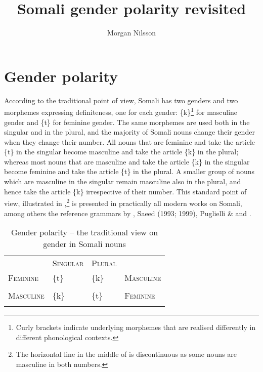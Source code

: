 \documentclass[output=paper]{langsci/langscibook}
\title{Somali gender polarity revisited}
\author{%
 Morgan Nilsson \affiliation{University of Gothenburg }
}
\begin{document}
 

 

\section{Gender polarity}

According to the traditional point of view, Somali has two genders and two morphemes expressing definiteness, one for each gender: \{k\}\footnote{Curly brackets indicate underlying morphemes that are realised differently in different phonological contexts.} for masculine gender and \{t\} for feminine gender. The same morphemes are used both in the singular and in the plural, and the majority of Somali nouns change their gender when they change their number. All nouns that are feminine and take the article \{t\} in the singular become masculine and take the article \{k\} in the plural; whereas most nouns that are masculine and take the article \{k\} in the singular become feminine and take the article \{t\} in the plural. A smaller group of nouns which are masculine in the singular remain masculine also in the plural, and hence take the article \{k\} irrespective of their number. This standard point of view, illustrated in ,\footnote{The horizontal line in the middle of  is discontinuous as some nouns are masculine in both numbers.
} is presented in practically all modern works on Somali, among others the reference grammars by \citet{Moreno1955}, Saeed (1993; 1999), Puglielli \& \citet{Mansuur1999} and \citet{Berchem2012}.
 
\begin{table}
\caption{Gender polarity – the traditional view on gender in Somali nouns}
\label{tab:1}

\begin{tabularx}{\textwidth}{XXXX} & \textsc{Singular}& \textsc{Plural}& \\
\lsptoprule
 \textsc{Feminine}& \{t\}& \{k\}& \textsc{Masculine}\par\\
\hhline{--~~} &  &  & \\
\hhline{~~--}
 \textsc{Masculine}& \{k\}& \{t\}& \textsc{Feminine}\par\\
\lspbottomrule
\end{tabularx}

\end{table} 
\end{document}
